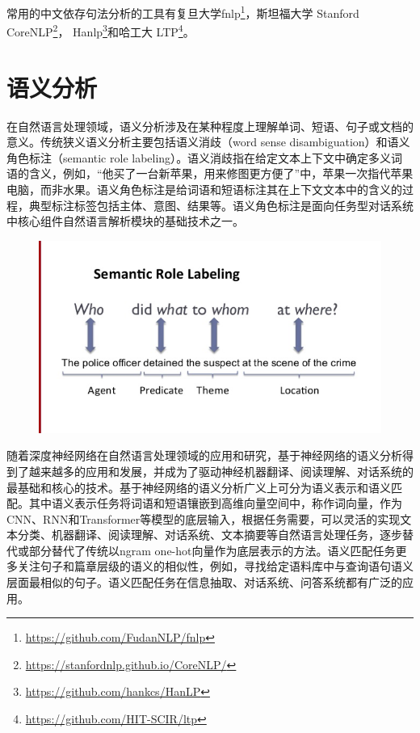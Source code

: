 常用的中文依存句法分析的工具有复旦大学fnlp\footnote{\url{https://github.com/FudanNLP/fnlp}}，斯坦福大学 Stanford CoreNLP\footnote{\url{https://stanfordnlp.github.io/CoreNLP/}}， Hanlp\footnote{\url{https://github.com/hankcs/HanLP}}和哈工大 LTP\footnote{\url{https://github.com/HIT-SCIR/ltp}}。





\section{语义分析}
在自然语言处理领域，语义分析涉及在某种程度上理解单词、短语、句子或文档的意义。传统狭义语义分析主要包括语义消歧（word sense disambiguation）\cite{ yarowsky1995unsupervised}和语义角色标注（semantic role labeling）\cite{ carreras2005introduction, bjorkelund2009multilingual}。语义消歧指在给定文本上下文中确定多义词语的含义，例如，“他买了一台新苹果，用来修图更方便了”中，苹果一次指代苹果电脑，而非水果。语义角色标注是给词语和短语标注其在上下文文本中的含义的过程，典型标注标签包括主体、意图、结果等。语义角色标注是面向任务型对话系统中核心组件自然语言解析模块的基础技术之一。
\begin{figure}[h]
\centering
\includegraphics[scale=1]{img/chapter_nlp/guang_analysis_1.png}
\label{fig:universe}
\end{figure}
随着深度神经网络在自然语言处理领域的应用和研究，基于神经网络的语义分析得到了越来越多的应用和发展，并成为了驱动神经机器翻译\cite{ bahdanau2014neural, luong2015effective}、阅读理解\cite{ hermann2015teaching}、对话系统\cite{ serban2016building, chen2017survey}的最基础和核心的技术。基于神经网络的语义分析广义上可分为语义表示和语义匹配。其中语义表示任务将词语和短语镶嵌到高维向量空间中，称作词向量，作为CNN\cite{ lecun1995convolutional}、RNN\cite{ hochreiter1997long}和Transformer\cite{ vaswani2017attention}等模型的底层输入，根据任务需要，可以灵活的实现文本分类\cite{ joulin2016bag, zhang2015character}、机器翻译、阅读理解、对话系统、文本摘要\cite{ tan2017abstractive, yao2017recent}等自然语言处理任务，逐步替代或部分替代了传统以ngram one-hot向量作为底层表示的方法。语义匹配任务更多关注句子和篇章层级的语义的相似性，例如，寻找给定语料库中与查询语句语义层面最相似的句子。语义匹配任务在信息抽取、对话系统、问答系统都有广泛的应用。
